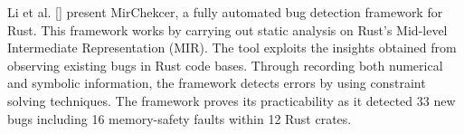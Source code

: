 Li et al. \ref{} present MirChekcer, a fully automated bug detection framework for Rust. This framework works by carrying out static analysis on Rust's Mid-level Intermediate Representation (MIR). The tool exploits the insights obtained from observing existing bugs in Rust code bases. Through recording both numerical and symbolic information, the framework detects errors by using constraint solving techniques. The framework proves its practicability as it detected 33 new bugs including 16 memory-safety faults within 12 Rust crates.


